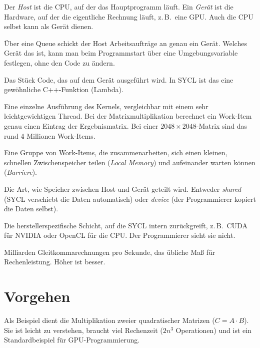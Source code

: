 \documentclass[11pt]{article}
\begin{document}
\begin{description}[style=nextline, leftmargin=0.5cm]
    \item[Host und Gerät (Device)]
    Der \emph{Host} ist die CPU, auf der das Hauptprogramm läuft. Ein
    \emph{Gerät} ist die Hardware, auf der die eigentliche Rechnung läuft,
    z.\,B.\ eine GPU. Auch die CPU selbst kann als Gerät dienen.
    \item[Queue (Warteschlange)]
    Über eine Queue schickt der Host Arbeitsaufträge an genau ein Gerät.
    Welches Gerät das ist, kann man beim Programmstart über eine
    Umgebungsvariable festlegen, ohne den Code zu ändern.
    \item[Kernel]
    Das Stück Code, das auf dem Gerät ausgeführt wird. In SYCL ist das eine
    gewöhnliche C++-Funktion (Lambda).
    \item[Work-Item]
    Eine einzelne Ausführung des Kernels, vergleichbar mit einem sehr
    leichtgewichtigen Thread. Bei der Matrixmultiplikation berechnet ein
    Work-Item genau einen Eintrag der Ergebnismatrix. Bei einer
    $2048 \times 2048$-Matrix sind das rund 4 Millionen Work-Items.
    \item[Work-Group]
    Eine Gruppe von Work-Items, die zusammenarbeiten, sich einen kleinen,
    schnellen Zwischenspeicher teilen (\emph{Local Memory}) und aufeinander
    warten können (\emph{Barriere}).
    \item[Unified Shared Memory (USM)]
    Die Art, wie Speicher zwischen Host und Gerät geteilt wird. Entweder
    \emph{shared} (SYCL verschiebt die Daten automatisch) oder
    \emph{device} (der Programmierer kopiert die Daten selbst).
    \item[Backend]
    Die herstellerspezifische Schicht, auf die SYCL intern zurückgreift,
    z.\,B.\ CUDA für NVIDIA oder OpenCL für die CPU. Der Programmierer sieht
    sie nicht.
    \item[GFLOPS]
    Milliarden Gleitkommarechnungen pro Sekunde, das übliche Maß für
    Rechenleistung. Höher ist besser.
\end{description}

\section{Vorgehen}

Als Beispiel dient die Multiplikation zweier quadratischer Matrizen
($C = A \cdot B$). Sie ist leicht zu verstehen, braucht viel Rechenzeit
($2n^3$ Operationen) und ist ein Standardbeispiel für GPU-Programmierung.
\end{document}
